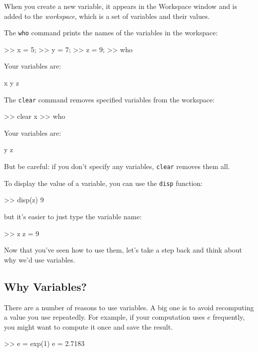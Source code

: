 When you create a new variable, it appears in the Workspace window and is added to the \emph{workspace}, which is a
set of variables and their values.


The \lstinline{who} command prints the
names of the variables in the workspace:


\begin{code}
>> x = 5;
>> y = 7;
>> z = 9;
>> who

Your variables are:

x  y  z
\end{code}

The \lstinline{clear} command removes specified variables from the workspace:

\begin{code}
>> clear x
>> who

Your variables are:

y z
\end{code}

But be careful: if you don't specify any variables, \lstinline{clear} removes them all.


To display the value of a variable, you can use the \lstinline{disp} function:

\begin{code}
>> disp(z)
     9
\end{code}
but it's easier to just type the variable name:

\begin{code}
>> z
z = 9
\end{code}

Now that you've seen how to use them, let's take a step back and think about why we'd use variables.

\subsection{Why Variables?}

There are a number of reasons to use variables.
A big one is to avoid recomputing a value you use repeatedly.  For
example, if your computation uses $e$ frequently, you might
want to compute it once and save the result.

\begin{code}
>> e = exp(1)
e = 2.7183
\end{code}

